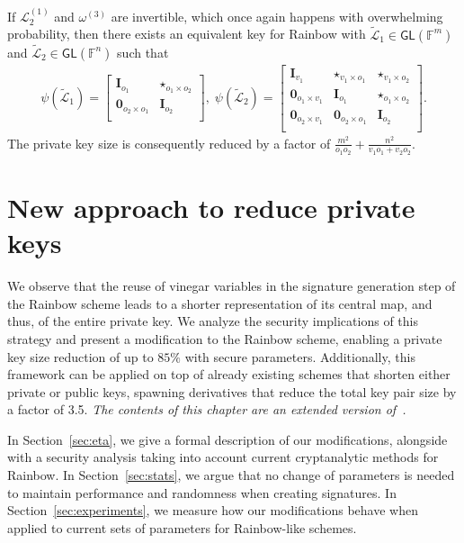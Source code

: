 \documentclass[12pt, a4paper, oneside]{memoir}
\theoremstyle{definition}
\begin{document}
If $\mathcal{L}_{2}^{(1)}$ and $\omega^{(3)}$ are invertible, which once again happens with overwhelming probability, then there exists an equivalent key for Rainbow with $\widetilde{\mathcal{L}}_{1} \in \mathsf{GL}(\mathbb{F}^{m})$ and $\widetilde{\mathcal{L}}_{2} \in \mathsf{GL}(\mathbb{F}^{n})$ such that
\begin{align}
  \psi(\widetilde{\mathcal{L}}_{1}) =
  \begin{bmatrix}
    \mathbf{I}_{o_{1}} & \star_{o_{1} \times o_{2}} \\
    \mathbf{0}_{o_{2} \times o_{1}} & \mathbf{I}_{o_{2}} \\
  \end{bmatrix},\;
  \psi(\widetilde{\mathcal{L}}_{2}) =
  \begin{bmatrix}
    \mathbf{I}_{v_{1}} & \star_{v_{1} \times o_{1}} & \star_{v_{1} \times o_{2}} \\
    \mathbf{0}_{o_{1} \times v_{1}} & \mathbf{I}_{o_{1}} & \star_{o_{1} \times o_{2}} \\
    \mathbf{0}_{o_{2} \times v_{1}} & \mathbf{0}_{o_{2} \times o_{1}} & \mathbf{I}_{o_{2}} \\
  \end{bmatrix}.
\end{align}
The private key size is consequently reduced by a factor of $\frac{m^{2}}{o_{1} o_{2}} + \frac{n^{2}}{v_{1} o_{1} + v_{2} o_{2}}$.

\chapter{New approach to reduce private keys}\label{chapter:eta}

We observe that the reuse of vinegar variables in the signature generation step of the Rainbow scheme leads to a shorter representation of its central map, and thus, of the entire private key. We analyze the security implications of this strategy and present a modification to the Rainbow scheme, enabling a private key size reduction of up to $85\%$ with secure parameters. Additionally, this framework can be applied on top of already existing schemes that shorten either private or public keys, spawning derivatives that reduce the total key pair size by a factor of 3.5. \emph{The contents of this chapter are an extended version of~\cite{Zambonin:201907}.}

In Section~\ref{sec:eta}, we give a formal description of our modifications, alongside with a security analysis taking into account current cryptanalytic methods for Rainbow. In Section~\ref{sec:stats}, we argue that no change of parameters is needed to maintain performance and randomness when creating signatures. In Section~\ref{sec:experiments}, we measure how our modifications behave when applied to current sets of parameters for Rainbow-like schemes.
\end{document}
